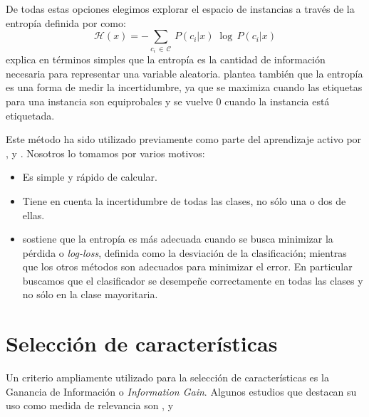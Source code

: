 De todas estas opciones elegimos explorar el espacio de instancias a través de la entropía definida por \citet{entropy-shannon} como:
\begin{equation*}
\mathcal{H}(x) = - \sum_{c_i\,\in\,\mathcal{C}} \, P(c_i|x)\; \log\,P(c_i|x)
\end{equation*}
\citet{information-theory-cover} explica en términos simples que la entropía es la cantidad de información necesaria para representar una variable aleatoria. \citet{multinomial-manning} plantea también que la entropía es una forma de medir la incertidumbre, ya que se maximiza cuando las etiquetas para una instancia son equiprobales y se vuelve 0 cuando la instancia está etiquetada.

Este método ha sido utilizado previamente como parte del aprendizaje activo por \citet{entropy-or}, \citet{settles-entropy} y \citet{Hwa-entropy}. Nosotros lo tomamos por varios motivos:
\begin{itemize}
    \item Es simple y rápido de calcular.
    \item Tiene en cuenta la incertidumbre de todas las clases, no sólo una o dos de ellas.
    \item \citet{settles_active_learning_survey} sostiene que la entropía es más adecuada cuando se busca minimizar la pérdida o \textit{log-loss}, definida como la desviación de la clasificación; mientras que los otros métodos son adecuados para minimizar el error. En particular buscamos que el clasificador se desempeñe correctamente en todas las clases y no sólo en la clase mayoritaria.
\end{itemize}



\section{Selección de características}\label{instance-selection}

Un criterio ampliamente utilizado para la selección de características es la Ganancia de Información o \textit{Information Gain}. Algunos estudios que destacan su uso como medida de relevancia son \citet{dualist}, \citet{forman-ig} y \citet{Sebastiani-text-categorization}

